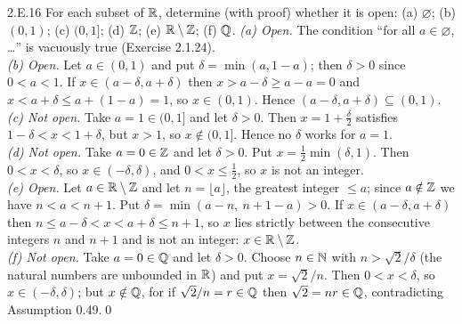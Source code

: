 \begin{bookex}[recommended]{2.E.16}
For each subset of $\mathbb{R}$, determine (with proof) whether it is open: (a) $\varnothing$; (b) $(0,1)$; (c) $(0,1]$; (d) $\mathbb{Z}$; (e) $\mathbb{R}\setminus\mathbb{Z}$; (f) $\mathbb{Q}$.
\solution
\emph{(a) Open.} The condition ``for all $a\in\varnothing$, \dots'' is vacuously true (Exercise 2.1.24).\\
\emph{(b) Open.} Let $a\in(0,1)$ and put $\delta=\min(a,1-a)$; then $\delta>0$ since $0<a<1$. If $x\in(a-\delta,a+\delta)$ then $x>a-\delta\ge a-a=0$ and $x<a+\delta\le a+(1-a)=1$, so $x\in(0,1)$. Hence $(a-\delta,a+\delta)\subseteq(0,1)$.\\
\emph{(c) Not open.} Take $a=1\in(0,1]$ and let $\delta>0$. Then $x=1+\frac\delta2$ satisfies $1-\delta<x<1+\delta$, but $x>1$, so $x\notin(0,1]$. Hence no $\delta$ works for $a=1$.\\
\emph{(d) Not open.} Take $a=0\in\mathbb{Z}$ and let $\delta>0$. Put $x=\frac12\min(\delta,1)$. Then $0<x<\delta$, so $x\in(-\delta,\delta)$, and $0<x\le\frac12$, so $x$ is not an integer.\\
\emph{(e) Open.} Let $a\in\mathbb{R}\setminus\mathbb{Z}$ and let $n=\lfloor a\rfloor$, the greatest integer $\le a$; since $a\notin\mathbb{Z}$ we have $n<a<n+1$. Put $\delta=\min(a-n,\ n+1-a)>0$. If $x\in(a-\delta,a+\delta)$ then $n\le a-\delta<x<a+\delta\le n+1$, so $x$ lies strictly between the consecutive integers $n$ and $n+1$ and is not an integer: $x\in\mathbb{R}\setminus\mathbb{Z}$.\\
\emph{(f) Not open.} Take $a=0\in\mathbb{Q}$ and let $\delta>0$. Choose $n\in\mathbb{N}$ with $n>\sqrt2/\delta$ (the natural numbers are unbounded in $\mathbb{R}$) and put $x=\sqrt2/n$. Then $0<x<\delta$, so $x\in(-\delta,\delta)$; but $x\notin\mathbb{Q}$, for if $\sqrt2/n=r\in\mathbb{Q}$ then $\sqrt2=nr\in\mathbb{Q}$, contradicting Assumption 0.49.\qed
\end{bookex}

